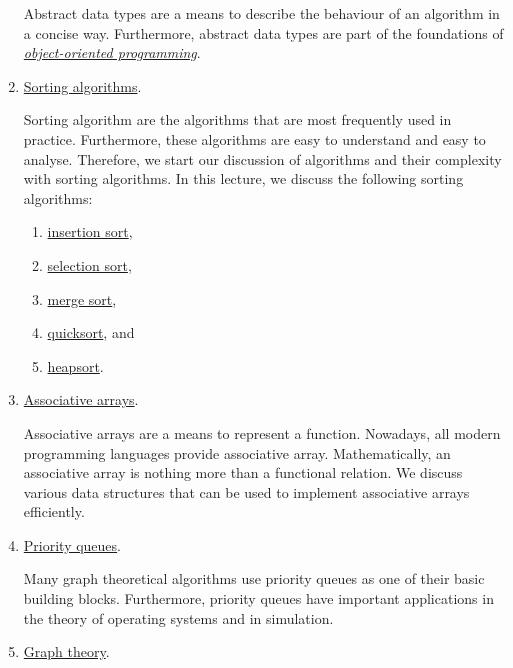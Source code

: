 \begin{enumerate}
      Abstract data types are a means to describe the behaviour of an algorithm in a concise way.
      Furthermore, abstract data types are part of the foundations of 
      \href{https://en.wikipedia.org/wiki/Object-oriented_programming}{\emph{object-oriented programming}}. 
\item \href{http://en.wikipedia.org/wiki/Sorting_algorithm}{Sorting algorithms}.

      Sorting algorithm are the algorithms that are most frequently used in practice.  Furthermore,
      these algorithms are easy to understand and easy to analyse.  Therefore, we start our
      discussion of algorithms and their complexity with sorting algorithms. 
      In this lecture, we discuss the following sorting algorithms:
      \begin{enumerate}
      \item \href{http://en.wikipedia.org/wiki/Insertion_sort}{insertion sort},
      \item \href{http://en.wikipedia.org/wiki/Selection_sort}{selection sort},
      \item \href{http://en.wikipedia.org/wiki/Merge_sort}{merge sort}, 
      \item \href{http://en.wikipedia.org/wiki/Quicksort}{quicksort}, and
      \item \href{https://en.wikipedia.org/wiki/Heapsort}{heapsort}.
      \end{enumerate}
%  

\item \href{http://en.wikipedia.org/wiki/Map_(computer_science)}{Associative arrays}.
  
      Associative arrays are a means to represent a function.  Nowadays, all modern programming
      languages provide associative array.  
      Mathematically, an associative array is nothing more than a functional relation.  
      We discuss various data structures that can be used to implement associative arrays efficiently.
\item \href{http://en.wikipedia.org/wiki/Priority_queue}{Priority queues}.
  
      Many graph theoretical algorithms use priority queues as one of their basic building blocks.
      Furthermore, priority queues have important applications in the theory of operating systems
      and in simulation.
\item \href{http://en.wikipedia.org/wiki/Graph_theory}{Graph theory}.
  

\end{enumerate}
